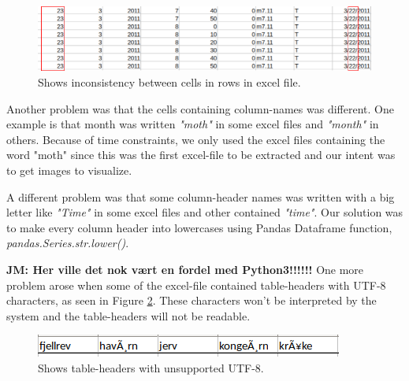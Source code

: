 \documentclass[USenglish]{uit-thesis}
\begin{document}
\begin{figure}[b]
\centering
\includegraphics[width=\textwidth]{inconsistency_done.png}
\caption{Shows inconsistency between cells in rows in excel file.}
\label{fig:inconsistency}
\end{figure}


Another problem was that the cells containing column-names was different. One example is that month was written \textit{"moth"} in some excel files and \textit{"month"} in others. Because of time constraints, we only used the excel files containing the word "moth" since this was the first excel-file to be extracted and our intent was to get images to visualize. 

A different problem was that some column-header names was written with a big letter like \textit{"Time"} in some excel files and other contained \textit{"time"}. Our solution was to make every column header into lowercases using Pandas Dataframe function, \textit{pandas.Series.str.lower()}.



\textbf{JM: Her ville det nok vært en fordel med Python3!!!!!!}
One more problem arose when some of the excel-file contained table-headers with UTF-8 characters, as seen in Figure \ref{fig:utf8}. These characters won't be interpreted by the system and the table-headers will not be readable.


\begin{figure}[b]
\centering
\includegraphics[width=\textwidth]{utf8.png}
\caption{Shows table-headers with unsupported UTF-8.}
\label{fig:utf8}
\end{figure}
\end{document}
